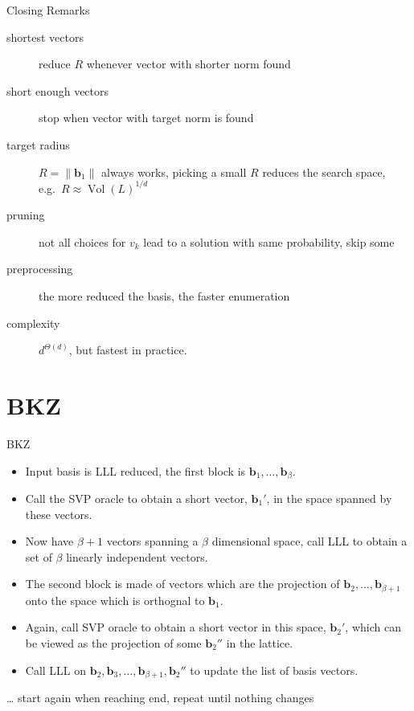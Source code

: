 \documentclass[presentation,smaller]{beamer}
\renewcommand{\vec}[1]{\mathbf{#1}\xspace}
\DeclareMathOperator{\Vol}{Vol}
\begin{document}
\begin{frame}[label={sec:orgd167a6a}]{Closing Remarks}
\begin{description}
\item[{shortest vectors}] reduce \(R\) whenever vector with shorter norm found
\item[{short enough vectors}] stop when vector with target norm is found
\item[{target radius}] \(R = \|\vec{b}_1\|\) always works, picking a small \(R\) reduces the search space, e.g. \(R ≈ \Vol(L)^{1/d}\)
\item[{pruning}] not all choices for \(v_k\) lead to a solution with same probability, skip some
\item[{preprocessing}] the more reduced the basis, the faster enumeration
\item[{complexity}] \(d^{\Theta(d)}\), but fastest in practice.
\end{description}
\end{frame}

\section{BKZ}
\label{sec:orgd78f375}
\begin{frame}[label={sec:org9ec497d}]{BKZ}
\begin{itemize}
\item Input basis is LLL reduced, the \alert{first block} is \(\vec{b}_1,\dots,\vec{b}_{β}\).
\item Call the SVP oracle to obtain a short vector, \(\vec{b}_1'\), in the space spanned by these vectors.
\item Now have \(β+1\) vectors spanning a \(β\) dimensional space, call LLL to obtain a set of \(β\) linearly independent vectors.
\item The \alert{second block} is made of vectors which are the projection of \(\vec{b}_2,\dots, \vec{b}_{β+1}\) onto the space which is orthognal to \(\vec{b}_1\).
\item Again, call SVP oracle to obtain a short vector in this space, \(\vec{b}_2'\), which can be viewed as the projection of some \(\vec{b}_2''\) in the lattice.
\item Call LLL on \(\vec{b}_2, \vec{b}_3,\dots, \vec{b}_{β+1}, \vec{b}_2''\) to update the list of basis vectors.
\end{itemize}

… start again when reaching end, repeat until nothing changes
\end{frame}
\end{document}
